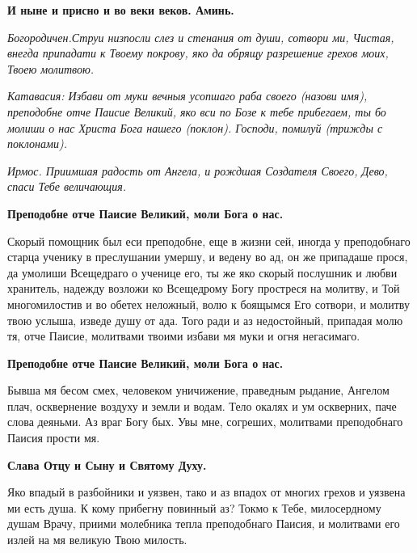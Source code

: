 \bfseries И ныне и присно и во веки веков. Аминь.\normalfont{} 




\itshape Богородичен.\normalfont{}Струи низпосли слез и стенания от души, сотвори ми, Чистая, внегда припадати к Твоему покрову, яко да обрящу разрешение грехов моих, Твоею молитвою.




\itshape Катавасия:\normalfont{} Избави от муки вечныя усопшаго раба своего (\itshape назови имя\normalfont{}), преподобне отче Паисие Великий, яко вси по Бозе к тебе прибегаем, ты бо молиши о нас Христа Бога нашего (\itshape поклон\normalfont{}). Господи, помилуй (\itshape трижды с поклонами\normalfont{}). 








\itshape Ирмос.\normalfont{} Приимшая радость от Ангела, и рождшая Создателя Своего, Дево, спаси Тебе величающия. 




\bfseries Преподобне отче Паисие Великий, моли Бога о нас.\normalfont{}


Скорый помощник был еси преподобне, еще в жизни сей, иногда у преподобнаго старца ученику в преслушании умершу, и ведену во ад, он же припадаше прося, да умолиши Всещедраго о ученице его, ты же яко скорый послушник и любви хранитель, надежду возложи ко Всещедрому Богу простреся на молитву, и Той многомилостив и во обетех неложный, волю к боящымся Его сотвори, и молитву твою услыша, изведе душу от ада. Того ради и аз недостойный, припадая молю тя, отче Паисие, молитвами твоими избави мя муки и огня негасимаго. 




\bfseries Преподобне отче Паисие Великий, моли Бога о нас.\normalfont{}


Бывша мя бесом смех, человеком уничижение, праведным рыдание, Ангелом плач, осквернение воздуху и земли и водам. Тело окалях и ум оскверних, паче слова деяньми. Аз враг Богу бых. Увы мне, согреших, молитвами преподобнаго Паисия прости мя. 




\bfseries Слава Отцу и Сыну и Святому Духу.\normalfont{}




Яко впадый в разбойники и уязвен, тако и аз впадох от многих грехов и уязвена ми есть душа. К кому прибегну повинный аз? Токмо к Тебе, милосердному душам Врачу, приими молебника тепла преподобнаго Паисия, и молитвами его излей на мя великую Твою милость. 




